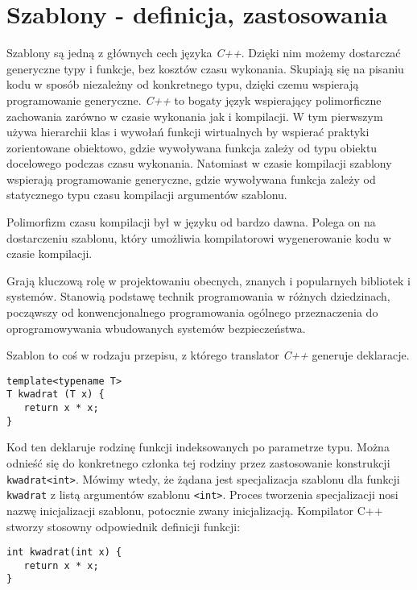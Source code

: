 \documentclass[11pt, a4paper]{article}
\begin{document}
\lstset{language=C++}

\section{Szablony - definicja, zastosowania}

Szablony są jedną z głównych cech języka \emph{C++}. Dzięki nim możemy dostarczać generyczne typy i funkcje, bez kosztów czasu wykonania. Skupiają się na pisaniu kodu w sposób niezależny od konkretnego typu, dzięki czemu wspierają programowanie generyczne. \emph{C++} to bogaty język wspierający polimorficzne zachowania zarówno w czasie wykonania jak i kompilacji. W tym pierwszym używa hierarchii klas i wywołań funkcji wirtualnych by wspierać praktyki zorientowane obiektowo, gdzie wywoływana funkcja zależy od typu obiektu docelowego podczas czasu wykonania. Natomiast w czasie kompilacji szablony wspierają programowanie generyczne, gdzie wywoływana funkcja zależy od statycznego typu czasu kompilacji argumentów szablonu.

Polimorfizm czasu kompilacji był w języku od bardzo dawna. Polega on na dostarczeniu szablonu, który umożliwia kompilatorowi wygenerowanie kodu w czasie kompilacji.

Grają kluczową rolę w projektowaniu obecnych, znanych i popularnych bibliotek i systemów. Stanowią podstawę technik programowania w różnych dziedzinach, począwszy od konwencjonalnego programowania ogólnego przeznaczenia do oprogramowywania wbudowanych 
systemów bezpieczeństwa.

Szablon to coś w rodzaju przepisu, z którego translator \emph{C++} generuje deklaracje.

\begin{lstlisting}[frame=single]
template<typename T>
T kwadrat (T x) {
   return x * x;
}
\end{lstlisting}

Kod ten deklaruje rodzinę funkcji indeksowanych po parametrze typu. Można odnieść się do konkretnego członka tej rodziny przez zastosowanie konstrukcji \verb#kwadrat<int>#. Mówimy wtedy, że żądana jest specjalizacja szablonu dla funkcji \verb#kwadrat# z listą argumentów szablonu \verb#<int>#. Proces tworzenia specjalizacji nosi nazwę inicjalizacji szablonu, potocznie zwany inicjalizacją. Kompilator C++ stworzy stosowny odpowiednik definicji funkcji:

\begin{lstlisting}[frame=single]
int kwadrat(int x) {
   return x * x;
}
\end{lstlisting}
\end{document}
